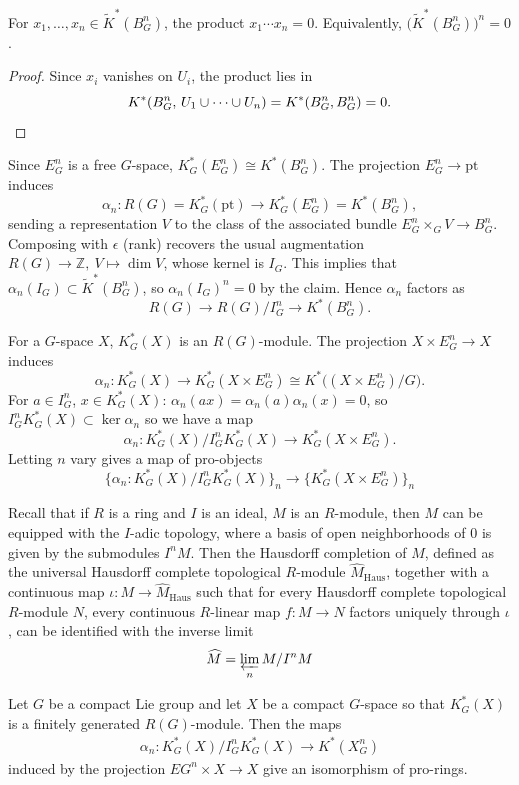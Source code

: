 \documentclass[12pt]{article}
\begin{document}
\begin{claim}
For $x_1,\dots,x_n\in\widetilde K^*(B_G^n)$, the product $x_1\cdots x_n=0$. Equivalently, $\big(\widetilde K^*(B_G^n)\big)^n=0$.
\end{claim}
\begin{proof}
Since $x_i$ vanishes on $U_i$, the product lies in
\[
K^*(B_G^n,\,U_1\cup\cdots\cup U_n) = K^*(B_G^n,B_G^n)=0. \qedhere
\]
\end{proof}


Since $E_G^n$ is a free $G$-space, $K_G^*(E_G^n)\cong K^*(B_G^n)$. The projection $E_G^n\to\mathrm{pt}$ induces
\[
\alpha_n : R(G) = K_G^*(\mathrm{pt}) \longrightarrow K_G^*(E_G^n) = K^*(B_G^n),
\]
sending a representation $V$ to the class of the associated bundle $E_G^n\times_G V \to B_G^n$. Composing with $\epsilon$ (rank) recovers the usual augmentation $R(G)\to\mathbb Z,\ V\mapsto\dim V$, whose kernel is $I_G$. This implies that $\alpha_n(I_G) \subset \widetilde K^*(B_G^n)$, so $\alpha_n(I_G)^n=0$ by the claim.
Hence $\alpha_n$ factors as
\[
R(G) \longrightarrow R(G)/I_G^n \longrightarrow K^*(B_G^n).
\]

For a $G$-space $X$, $K_G^*(X)$ is an $R(G)$-module. The projection $X\times E_G^n\to X$ induces
\[
\alpha_n : K_G^*(X)\longrightarrow K_G^*(X\times E_G^n) \cong K^*\!\big((X\times E_G^n)/G\big).
\]
For $a\in I_G^n$, $x\in K_G^*(X)$: $\alpha_n(ax)=\alpha_n(a)\alpha_n(x)=0$, so $I_G^n K_G^*(X)\subset\ker\alpha_n$ so we have a map
\[
\alpha_n : K_G^*(X)/I_G^n K_G^*(X) \longrightarrow K_G^*(X\times E_G^n).
\]
Letting $n$ vary gives a map of pro-objects
\[\{\alpha_n : K_G^*(X)/I_G^n K_G^*(X)\}_n \longrightarrow \{K_G^*(X\times E_G^n)\}_n\]

Recall that if $R$ is a ring and $I$ is an ideal, $M$ is an $R$-module, then $M$ can be equipped with the $I$-adic topology, where a basis of open neighborhoods of $0$ is given by the submodules $I^nM$. Then the Hausdorff completion of $M$, defined as the universal Hausdorff complete topological $R$-module $\widehat M_{\mathrm{Haus}}$, together with a continuous map $\iota:M\to \widehat M_{\mathrm{Haus}}$ such that for every Hausdorff complete topological $R$-module $N$, every continuous $R$-linear map $f:M\to N$ factors uniquely through $\iota$, can be identified with the inverse limit
\[\widehat M = \varprojlim_n M/I^nM
\]



\begin{theorem}
Let $G$ be a compact Lie group and let $X$ be a compact $G$-space so that $K_G^*(X)$ is a finitely generated $R(G)$-module. Then the maps \begin{align*}
    \alpha_n:K_G^*(X)/I_G^nK_G^*(X)\longrightarrow K^*(X_G^n)
\end{align*}
induced by the projection $EG^n\times X\to X$ give an isomorphism of pro-rings.
\end{theorem}
\end{document}
